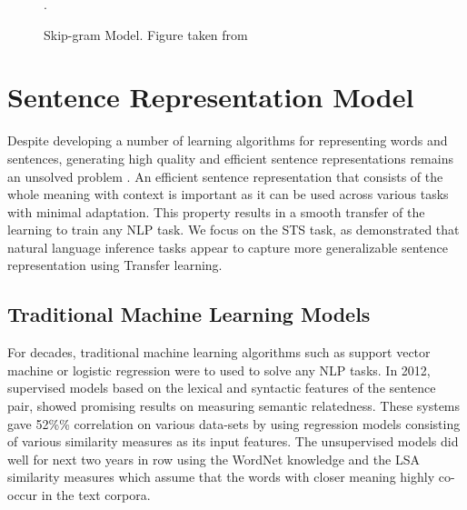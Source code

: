 \documentclass[12pt]{report} %
\begin{document}
\begin{figure}[!tbp]
	\centering
	\caption{Skip-gram Model. Figure taken from \cite{jurafsky2014speech}}.
	\label{skipgram}	
\end{figure}


\section{Sentence Representation Model}
\label{sent_rep}

Despite developing a number of learning algorithms for representing words and sentences, generating high quality and efficient sentence representations remains an unsolved problem \citep{conneau2017supervised}. An efficient sentence representation that consists of the whole meaning with context is important as it can be used across various tasks with minimal adaptation. This property results in a smooth transfer of the learning to train any NLP task. We focus on the STS task, as \cite{conneau2017supervised} demonstrated that natural language inference tasks appear to capture more generalizable sentence representation using Transfer learning.


\subsection{Traditional Machine Learning Models}
\label{ml_models_rw}

For decades, traditional machine learning algorithms such as support vector machine or logistic regression were to used to solve any NLP tasks. In 2012, supervised models based on the lexical and syntactic features of the sentence pair, showed promising results on measuring semantic relatedness. These systems gave 52\%\% correlation on various data-sets by using regression models consisting of various similarity measures as its input features. The unsupervised models did well for next two years in row using the WordNet knowledge and the LSA similarity measures which assume that the words with closer meaning highly co-occur in the text corpora. 
\end{document}
